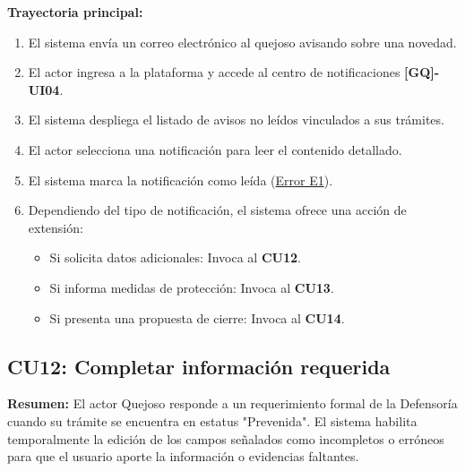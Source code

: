 \begin{appendices}
\textbf{Trayectoria principal:}
\begin{enumerate}[nosep]
    \item El sistema envía un correo electrónico al quejoso avisando sobre una novedad.
    \item El actor ingresa a la plataforma y accede al centro de notificaciones \textbf{[GQ]-UI04}.
    \item El sistema despliega el listado de avisos no leídos vinculados a sus trámites.
    \item El actor selecciona una notificación para leer el contenido detallado.
    \item El sistema marca la notificación como leída (\hyperlink{err:E16}{Error E1}).
    \item Dependiendo del tipo de notificación, el sistema ofrece una acción de extensión:
    \begin{itemize}[nosep]
        \item Si solicita datos adicionales: Invoca al \textbf{CU12}.
        \item Si informa medidas de protección: Invoca al \textbf{CU13}.
        \item Si presenta una propuesta de cierre: Invoca al \textbf{CU14}.
    \end{itemize}
\end{enumerate}


\subsection{CU12: Completar información requerida}

\textbf{Resumen:} 
El actor Quejoso responde a un requerimiento formal de la Defensoría cuando su trámite se encuentra en estatus "Prevenida". El sistema habilita temporalmente la edición de los campos señalados como incompletos o erróneos para que el usuario aporte la información o evidencias faltantes.


\end{appendices}

